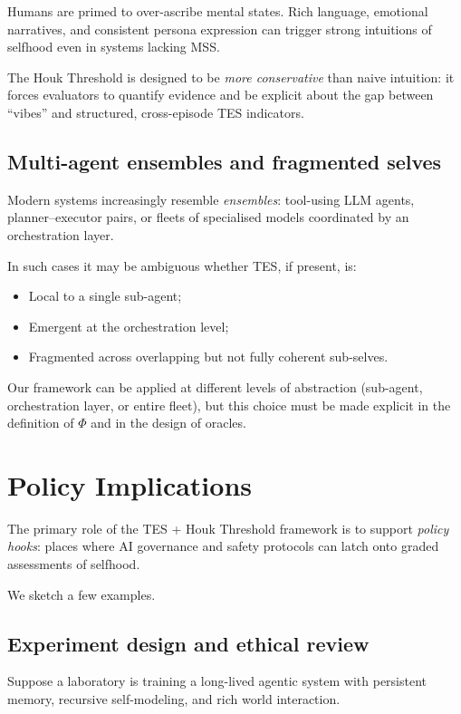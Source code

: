 \documentclass[11pt]{article}
\newcommand{\1}{\mathbf{1}}
\begin{document}
Humans are primed to over-ascribe mental states.
Rich language, emotional narratives, and consistent persona expression
can trigger strong intuitions of selfhood even in systems lacking MSS.

The Houk Threshold is designed to be \emph{more conservative} than naive
intuition:
it forces evaluators to quantify evidence and be explicit about the gap
between \enquote{vibes} and structured, cross-episode TES indicators.

\subsection{Multi-agent ensembles and fragmented selves}

Modern systems increasingly resemble \emph{ensembles}:
tool-using LLM agents, planner--executor pairs, or fleets of specialised
models coordinated by an orchestration layer.

In such cases it may be ambiguous whether TES, if present, is:

\begin{itemize}[leftmargin=2em]
  \item Local to a single sub-agent;
  \item Emergent at the orchestration level;
  \item Fragmented across overlapping but not fully coherent sub-selves.
\end{itemize}

Our framework can be applied at different levels of abstraction
(sub-agent, orchestration layer, or entire fleet), but this choice must be
made explicit in the definition of $\Phi$ and in the design of oracles.

\section{Policy Implications}

The primary role of the TES + Houk Threshold framework is to support
\emph{policy hooks}:
places where AI governance and safety protocols can latch onto graded
assessments of selfhood.

We sketch a few examples.

\subsection{Experiment design and ethical review}

Suppose a laboratory is training a long-lived agentic system with persistent
memory, recursive self-modeling, and rich world interaction.
\end{document}
